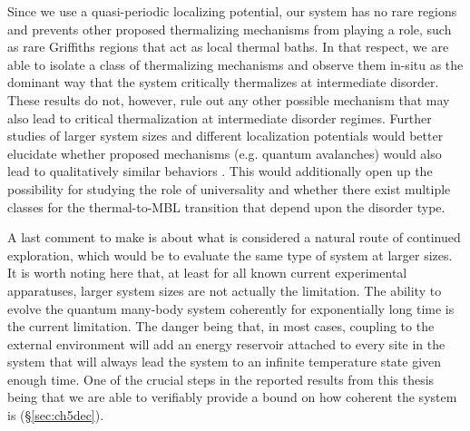 Since we use a quasi-periodic localizing potential, our system has no rare regions and prevents other proposed thermalizing mechanisms from playing a role, such as rare Griffiths regions that act as local thermal baths. In that respect, we are able to isolate a class of thermalizing mechanisms and observe them in-situ as the dominant way that the system critically thermalizes at intermediate disorder. These results do not, however, rule out any other possible mechanism that may also lead to critical thermalization at intermediate disorder regimes. Further studies of larger system sizes and different localization potentials would better elucidate whether proposed mechanisms (e.g. quantum avalanches) would also lead to qualitatively similar behaviors \cite{Potter2015,Vosk2015,Zhang2018,Roeck2017,Luitz2017,Ponte2017}. This would additionally open up the possibility for studying the role of universality and whether there exist multiple classes for the thermal-to-MBL transition that depend upon the disorder type\cite{Khemani2017a}. 

A last comment to make is about what is considered a natural route of continued exploration, which would be to evaluate the same type of system at larger sizes. It is worth noting here that, at least for all known current experimental apparatuses, larger system sizes are not actually the limitation. The ability to evolve the quantum many-body system coherently for exponentially long time is the current limitation. The danger being that, in most cases, coupling to the external environment will add an energy reservoir attached to every site in the system that will always lead the system to an infinite temperature state given enough time. One of the crucial steps in the reported results from this thesis being that we are able to verifiably provide a bound on how coherent the system is (\S \ref{sec:ch5dec}). 






